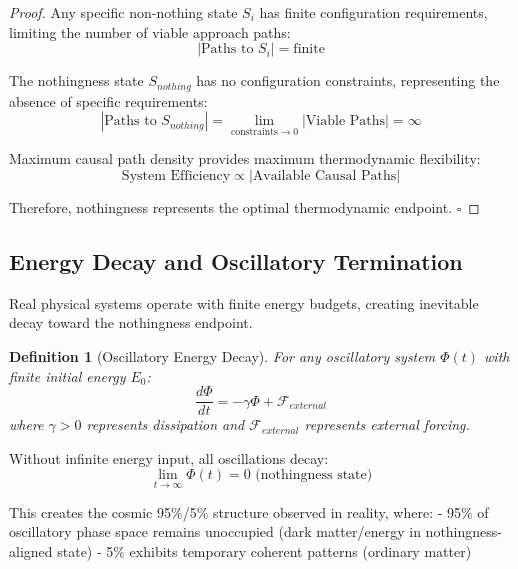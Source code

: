 \documentclass[12pt,a4paper]{article}
\newtheorem{definition}{Definition}
\begin{document}
\begin{proof}
Any specific non-nothing state $S_i$ has finite configuration requirements, limiting the number of viable approach paths:
\begin{equation}
|\text{Paths to } S_i| = \text{finite}
\end{equation}

The nothingness state $S_{nothing}$ has no configuration constraints, representing the absence of specific requirements:
\begin{equation}
|\text{Paths to } S_{nothing}| = \lim_{\text{constraints} \to 0} |\text{Viable Paths}| = \infty
\end{equation}

Maximum causal path density provides maximum thermodynamic flexibility:
\begin{equation}
\text{System Efficiency} \propto |\text{Available Causal Paths}|
\end{equation}

Therefore, nothingness represents the optimal thermodynamic endpoint. $\square$
\end{proof}

\subsection{Energy Decay and Oscillatory Termination}

Real physical systems operate with finite energy budgets, creating inevitable decay toward the nothingness endpoint.

\begin{definition}[Oscillatory Energy Decay]
For any oscillatory system $\Phi(t)$ with finite initial energy $E_0$:
\begin{equation}
\frac{d\Phi}{dt} = -\gamma \Phi + \mathcal{F}_{external}
\end{equation}
where $\gamma > 0$ represents dissipation and $\mathcal{F}_{external}$ represents external forcing.
\end{definition}

Without infinite energy input, all oscillations decay:
\begin{equation}
\lim_{t \to \infty} \Phi(t) = 0 \text{ (nothingness state)}
\end{equation}

This creates the cosmic 95\%/5\% structure observed in reality, where:
- 95\% of oscillatory phase space remains unoccupied (dark matter/energy in nothingness-aligned state)
- 5\% exhibits temporary coherent patterns (ordinary matter)
\end{document}
